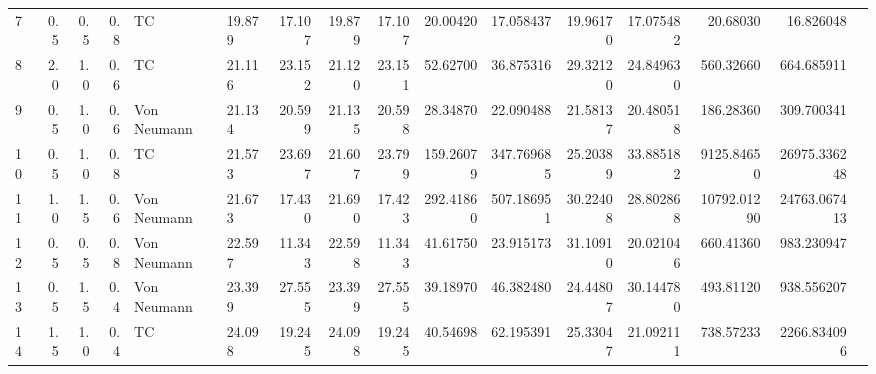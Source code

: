 \begin{tabular}{lrrrllrrrrrrrrrr}
7  & 0.5  & 0.5  & 0.8  & TC          & 19.879                                  & 17.107                           & 19.879                           & 17.107                             & 20.00420  & 17.058437   & 19.96170 & 17.075482 & 20.68030    & 16.826048    \\
8  & 2.0  & 1.0  & 0.6  & TC          & 21.116                                  & 23.152                           & 21.120                           & 23.151                             & 52.62700  & 36.875316   & 29.32120 & 24.849630 & 560.32660   & 664.685911   \\
9  & 0.5  & 1.0  & 0.6  & Von Neumann & 21.134                                  & 20.599                           & 21.135                           & 20.598                             & 28.34870  & 22.090488   & 21.58137 & 20.480518 & 186.28360   & 309.700341   \\
10 & 0.5  & 1.0  & 0.8  & TC          & 21.573                                  & 23.697                           & 21.607                           & 23.799                             & 159.26079 & 347.769685  & 25.20389 & 33.885182 & 9125.84650  & 26975.336248 \\
11 & 1.0  & 1.5  & 0.6  & Von Neumann & 21.673                                  & 17.430                           & 21.690                           & 17.423                             & 292.41860 & 507.186951  & 30.22408 & 28.802868 & 10792.01290 & 24763.067413 \\
12 & 0.5  & 0.5  & 0.8  & Von Neumann & 22.597                                  & 11.343                           & 22.598                           & 11.343                             & 41.61750  & 23.915173   & 31.10910 & 20.021046 & 660.41360   & 983.230947   \\
13 & 0.5  & 1.5  & 0.4  & Von Neumann & 23.399                                  & 27.555                           & 23.399                           & 27.555                             & 39.18970  & 46.382480   & 24.44807 & 30.144780 & 493.81120   & 938.556207   \\
14 & 1.5  & 1.0  & 0.4  & TC          & 24.098                                  & 19.245                           & 24.098                           & 19.245                             & 40.54698  & 62.195391   & 25.33047 & 21.092111 & 738.57233   & 2266.834096  \\
\bottomrule
\end{tabular}
